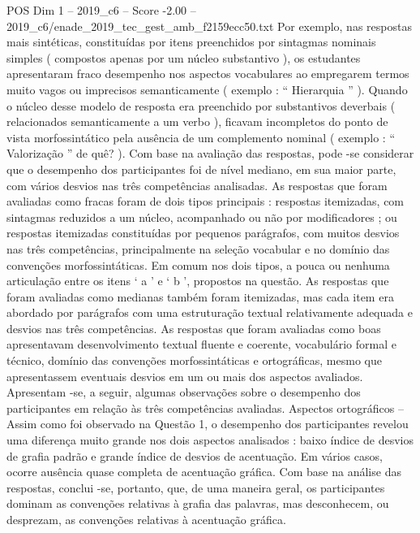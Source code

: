 \begin{textsample}{POS Dim 1 – 2019\_c6 – Score -2.00 – 2019\_c6/enade\_2019\_tec\_gest\_amb\_f2159ecc50.txt}
Por exemplo, nas respostas mais sintéticas, constituídas por itens preenchidos por sintagmas nominais simples ( compostos apenas por um núcleo substantivo ), os estudantes apresentaram fraco desempenho nos aspectos vocabulares ao empregarem termos muito vagos ou imprecisos semanticamente ( exemplo : “ Hierarquia ” ).
Quando o núcleo desse modelo de resposta era preenchido por substantivos deverbais ( relacionados semanticamente a um verbo ), ficavam incompletos do ponto de vista morfossintático pela ausência de um complemento nominal ( exemplo : “ Valorização ” de quê? ).
Com base na avaliação das respostas, pode -se considerar que o desempenho dos participantes foi de nível mediano, em sua maior parte, com vários desvios nas três competências analisadas.
As respostas que foram avaliadas como fracas foram de dois tipos principais : respostas itemizadas, com sintagmas reduzidos a um núcleo, acompanhado ou não por modificadores ; ou respostas itemizadas constituídas por pequenos parágrafos, com muitos desvios nas três competências, principalmente na seleção vocabular e no domínio das convenções morfossintáticas.
Em comum nos dois tipos, a pouca ou nenhuma articulação entre os itens ‘ a ’ e ‘ b ’, propostos na questão.
As respostas que foram avaliadas como medianas também foram itemizadas, mas cada item era abordado por parágrafos com uma estruturação textual relativamente adequada e desvios nas três competências.
As respostas que foram avaliadas como boas apresentavam desenvolvimento textual fluente e coerente, vocabulário formal e técnico, domínio das convenções morfossintáticas e ortográficas, mesmo que apresentassem eventuais desvios em um ou mais dos aspectos avaliados.
Apresentam -se, a seguir, algumas observações sobre o desempenho dos participantes em relação às três competências avaliadas.
Aspectos ortográficos – Assim como foi observado na Questão 1, o desempenho dos participantes revelou uma diferença muito grande nos dois aspectos analisados : baixo índice de desvios de grafia padrão e grande índice de desvios de acentuação.
Em vários casos, ocorre ausência quase completa de acentuação gráfica.
Com base na análise das respostas, conclui -se, portanto, que, de uma maneira geral, os participantes dominam as convenções relativas à grafia das palavras, mas desconhecem, ou desprezam, as convenções relativas à acentuação gráfica.

\end{textsample}
